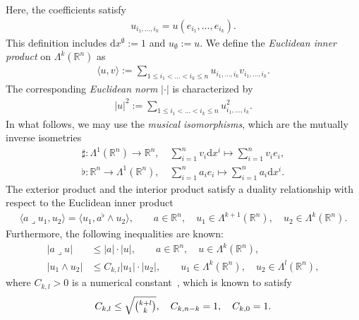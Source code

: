 \documentclass[10pt,a4paper]{amsart}
\theoremstyle{definition}
\theoremstyle{remark}
\numberwithin{equation}{section}
\newcommand{\bbR}{{\mathbb R}}
\newcommand{\tsum}{{\textstyle{\sum}}}
\newcommand{\contract}{\mathbin{\lrcorner}}
\newcommand{\vecnorm}[1]{|#1|}
\newcommand{\cartanx}{{\mathrm d}x}
\newcommand{\Alt}[1]{\Lambda^{#1}}
\begin{document}
Here, the coefficients satisfy 
\begin{gather*}
    u_{i_1,\dots,i_k} = u( e_{i_1}, \dots, e_{i_k} ).
\end{gather*}
This definition includes $\cartanx^{\emptyset} := 1$ and $u_{\emptyset} := u$.
We define the \emph{Euclidean inner product} on $\Alt{k}(\bbR^{n})$ as 
\begin{gather*}
    \langle u, v \rangle 
    := 
    \sum_{1 \leq i_1 < \dots < i_k \leq n}
    u_{i_1,\dots,i_k} v_{i_1,\dots,i_k}
    .
\end{gather*}
The corresponding \emph{Euclidean norm} $\vecnorm{\cdot}$ is characterized by
\begin{gather*}
    \vecnorm{u}^{2}
    := 
    \sum_{1 \leq i_1 < \dots < i_k \leq n}
    u_{i_1,\dots,i_k}^{2}
    .
\end{gather*}
In what follows, we may use the \emph{musical isomorphisms}, 
which are the mutually inverse isometries 
\begin{gather*}
    \sharp : \Alt{1}(\bbR^{n}) \to \bbR^{n}, \quad \tsum_{i=1}^{n} v_i \cartanx^{i} \mapsto \tsum_{i=1}^{n} v_i e_{i},
    \\
    \flat  : \bbR^{n} \to \Alt{1}(\bbR^{n}), \quad \tsum_{i=1}^{n} a_i e_{i}        \mapsto \tsum_{i=1}^{n} a_i \cartanx^{i}.
\end{gather*}
The exterior product and the interior product satisfy a duality relationship with respect to the Euclidean inner product 
\begin{gather*}
    \langle a \contract u_1, u_2 \rangle = \langle u_1, a^{\flat} \wedge u_2 \rangle,
    \qquad 
    a \in \bbR^{n}, \quad u_1 \in \Alt{k+1}(\bbR^{n}), \quad u_2 \in \Alt{k}(\bbR^{n}).
\end{gather*}
Furthermore, the following inequalities are known:
\begin{align*}
    \vecnorm{ a \contract u }  &\leq \vecnorm{a} \cdot \vecnorm{u}, \qquad a \in \bbR^{n}, \quad u \in \Alt{k}(\bbR^{n}),
    \\
    \vecnorm{ u_1 \wedge u_2 } &\leq C_{k,l} \vecnorm{u_1} \cdot \vecnorm{u_2}, \qquad u_1 \in \Alt{k}(\bbR^{n}), \quad u_2 \in \Alt{l}(\bbR^{n}),
\end{align*}
where $C_{k,l} > 0$ is a numerical constant~\cite[Section~1.7.5]{federer}, which is known to satisfy
\begin{gather*}
    C_{k,l} \leq \sqrt{ \tbinom{k+l}{k} },
    \quad
    C_{k,n-k} = 1,
    \quad
    C_{k,0} = 1.
\end{gather*}
\end{document}

